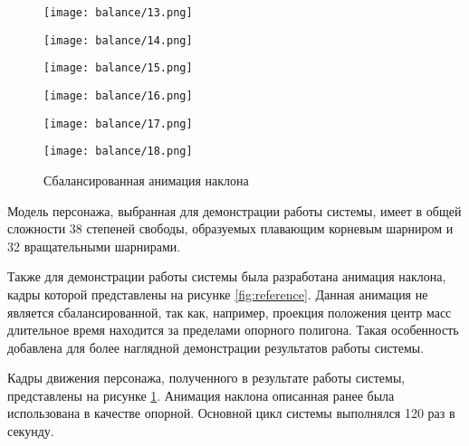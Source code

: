 \begin{figure}
\begin{minipage}{0.325\textwidth}
    \centering
    \texttt{[image: balance/13.png]}
  \end{minipage}
  \begin{minipage}{0.325\textwidth}
    \centering
    \texttt{[image: balance/14.png]}
  \end{minipage}
  \begin{minipage}{0.325\textwidth}
    \centering
    \texttt{[image: balance/15.png]}
  \end{minipage}
  \vfill
  \hfill
  \begin{minipage}{0.325\textwidth}
    \centering
    \texttt{[image: balance/16.png]}
  \end{minipage}
  \begin{minipage}{0.325\textwidth}
    \centering
    \texttt{[image: balance/17.png]}
  \end{minipage}
  \begin{minipage}{0.325\textwidth}
    \centering
    \texttt{[image: balance/18.png]}
  \end{minipage}
  \caption{Сбалансированная анимация наклона}
  \label{fig:result}
\end{figure}

Модель персонажа, выбранная для демонстрации работы системы, имеет в общей сложности 38 степеней свободы, образуемых плавающим корневым шарниром и 32 вращательными шарнирами.

Также для демонстрации работы системы была разработана анимация наклона, кадры которой представлены на рисунке \ref{fig:reference}. Данная анимация не является сбалансированной, так как, например, проекция положения центр масс длительное время находится за пределами опорного полигона. Такая особенность добавлена для более наглядной демонстрации результатов работы системы.

Кадры движения персонажа, полученного в результате работы системы, представлены на рисунке \ref{fig:result}. Анимация наклона описанная ранее была использована в качестве опорной. Основной цикл системы выполнялся 120 раз в секунду.




